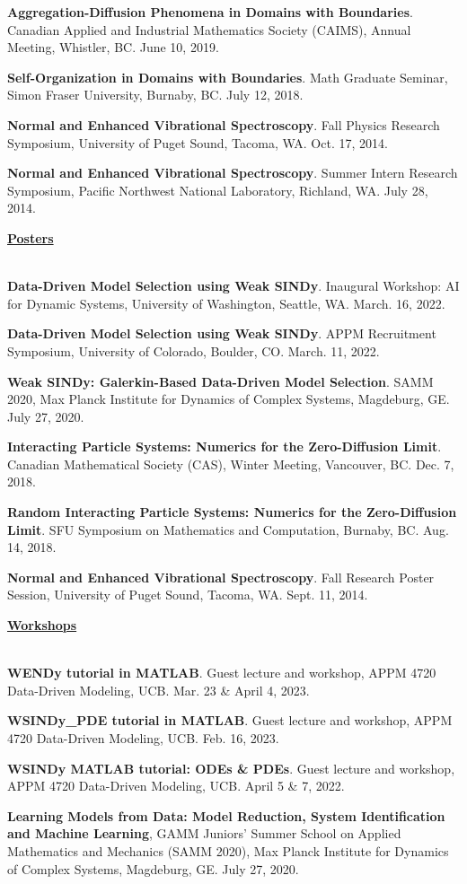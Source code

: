 \documentclass[letterpaper,11pt,oneside]{article}
\newcommand{\headr}[1]{\vspace{10pt}\uline{\Large{\textbf{#1}} \hfill } \\ \vspace{-10pt}\\}
\begin{document}
\begin{enumerate}[label={[\arabic*]}]
\item \textbf{Aggregation-Diffusion Phenomena in Domains with Boundaries}. Canadian Applied and Industrial Mathematics Society (CAIMS), Annual Meeting, Whistler, BC. June 10, 2019.
\item \textbf{Self-Organization in Domains with Boundaries}. Math Graduate Seminar, Simon Fraser University, Burnaby, BC. July 12, 2018.
\item \textbf{Normal and Enhanced Vibrational Spectroscopy}. Fall Physics Research Symposium, University of Puget Sound, Tacoma, WA. Oct. 17, 2014.
\item \textbf{Normal and Enhanced Vibrational Spectroscopy}. Summer Intern Research Symposium, Pacific Northwest National Laboratory, Richland, WA. July 28, 2014.
\end{enumerate}

\headr{Posters} 
\begin{enumerate}[label={[\arabic*]}]
\item \textbf{Data-Driven Model Selection using Weak SINDy}. Inaugural Workshop: AI for Dynamic Systems, University of Washington, Seattle, WA. March. 16, 2022.
\item \textbf{Data-Driven Model Selection using Weak SINDy}. APPM Recruitment Symposium, University of Colorado, Boulder, CO. March. 11, 2022.
\item \textbf{Weak SINDy: Galerkin-Based Data-Driven Model Selection}. SAMM 2020, Max Planck Institute for Dynamics of Complex Systems, Magdeburg, GE. July 27, 2020.
\item \textbf{Interacting Particle Systems: Numerics for the Zero-Diffusion Limit}. Canadian Mathematical Society (CAS), Winter Meeting, Vancouver, BC. Dec. 7, 2018.
\item \textbf{Random Interacting Particle Systems: Numerics for the Zero-Diffusion Limit}. SFU Symposium on Mathematics and Computation, Burnaby, BC. Aug. 14, 2018.
\item \textbf{Normal and Enhanced Vibrational Spectroscopy}. Fall Research Poster Session, University of Puget Sound, Tacoma, WA. Sept. 11, 2014.
\end{enumerate}

\headr{Workshops}

\begin{enumerate}[label={[\arabic*]}]
\item \textbf{WENDy tutorial in MATLAB}. Guest lecture and workshop, APPM 4720 Data-Driven Modeling, UCB. Mar. 23 \& April 4, 2023.
\item \textbf{WSINDy\_PDE tutorial in MATLAB}. Guest lecture and workshop, APPM 4720 Data-Driven Modeling, UCB. Feb. 16, 2023.
\item \textbf{WSINDy MATLAB tutorial: ODEs \& PDEs}. Guest lecture and workshop, APPM 4720 Data-Driven Modeling, UCB. April 5 \& 7, 2022.
\item \textbf{Learning Models from Data: Model Reduction, System Identification and Machine Learning}, GAMM Juniors' Summer School on Applied Mathematics and Mechanics (SAMM 2020), Max Planck Institute for Dynamics of Complex Systems, Magdeburg, GE. July 27, 2020.
\end{enumerate}
\end{document}
